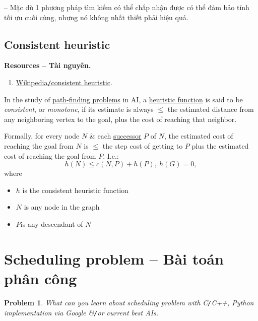 \documentclass{article}
\newtheorem{problem}{Problem}
\begin{document}
-- Mặc dù 1 phương pháp tìm kiếm có thể chấp nhận được có thể đảm bảo tính tối ưu cuối cùng, nhưng nó không nhất thiết phải hiệu quả.


\subsection{Consistent heuristic}
\textbf{\textsf{Resources -- Tài nguyên.}}
\begin{enumerate}
	\item \href{https://en.wikipedia.org/wiki/Consistent_heuristic}{Wikipedia{\tt/}consistent heuristic}.
\end{enumerate}
In the study of \href{https://en.wikipedia.org/wiki/Shortest_path_problem}{path-finding problems} in AI, a \href{https://en.wikipedia.org/wiki/Heuristic_function}{heuristic function} is said to be {\it consistent}, or {\it monotone}, if its estimate is always $\le$ the estimated distance from any neighboring vertex to the goal, plus the cost of reaching that neighbor.

Formally, for every node $N$ \& each \href{https://en.wikipedia.org/wiki/Successor_(graph_theory)#Direction}{successor} $P$ of $N$, the estimated cost of reaching the goal from $N$ is $\le$ the step cost of getting to $P$ plus the estimated cost of reaching the goal from $P$. I.e.:
\begin{equation*}
	h(N)\le c(N,P) + h(P),\ h(G) = 0,
\end{equation*}
where
\begin{itemize}
	\item $h$ is the consistent heuristic function
	\item $N$ is any node in the graph
	\item $P$is any descendant of $N$
\end{itemize}


\section{Scheduling problem -- Bài toán phân công}

\begin{problem}
	What can you learn about scheduling problem with {\sf C{\tt/}C++, Python} implementation via Google \&{\tt/}or current best AIs.
\end{problem}
\end{document}
